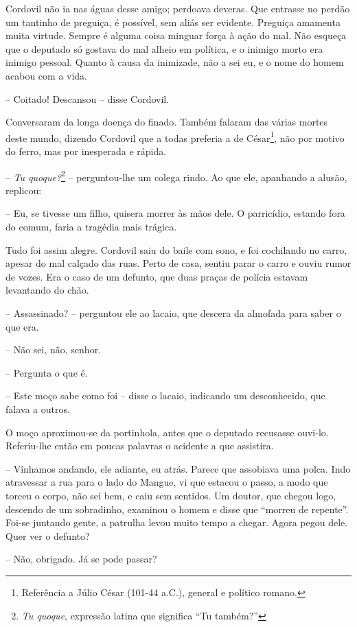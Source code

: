 Cordovil não ia nas águas desse amigo; perdoava deveras. Que entrasse no
perdão um tantinho de preguiça, é possível, sem aliás ser evidente.
Preguiça amamenta muita virtude. Sempre é alguma coisa minguar força à
ação do mal. Não esqueça que o deputado só gostava do mal alheio em
política, e o inimigo morto era inimigo pessoal. Quanto à causa da
inimizade, não a sei eu, e o nome do homem acabou com a vida.

-- Coitado! Descansou -- disse Cordovil.

Conversaram da longa doença do finado. Também falaram das várias mortes
deste mundo, dizendo Cordovil que a todas preferia a de César\footnote{Referência
  a Júlio César (101-44 a.C.), general e político romano.}, não por
motivo do ferro, mas por inesperada e rápida.

-- \emph{Tu quoque?}\footnote{\emph{Tu quoque}, expressão latina que
  significa ``Tu também?''} -- perguntou-lhe um colega rindo. Ao que
ele, apanhando a alusão, replicou:

-- Eu, se tivesse um filho, quisera morrer às mãos dele. O parricídio,
estando fora do comum, faria a tragédia mais trágica.

Tudo foi assim alegre. Cordovil saiu do baile com sono, e foi cochilando
no carro, apesar do mal calçado das ruas. Perto de casa, sentiu parar o
carro e ouviu rumor de vozes. Era o caso de um defunto, que duas praças
de polícia estavam levantando do chão.

-- Assassinado? -- perguntou ele ao lacaio, que descera da almofada para
saber o que era.

-- Não sei, não, senhor.

-- Pergunta o que é.

-- Este moço sabe como foi -- disse o lacaio, indicando um desconhecido,
que falava a outros.

O moço aproximou-se da portinhola, antes que o deputado recusasse
ouvi-lo. Referiu-lhe então em poucas palavras o acidente a que
assistira.

-- Vínhamos andando, ele adiante, eu atrás. Parece que assobiava uma
polca. Indo atravessar a rua para o lado do Mangue, vi que estacou o
passo, a modo que torceu o corpo, não sei bem, e caiu sem sentidos. Um
doutor, que chegou logo, descendo de um sobradinho, examinou o homem e
disse que ``morreu de repente''. Foi-se juntando gente, a patrulha levou
muito tempo a chegar. Agora pegou dele. Quer ver o defunto?

-- Não, obrigado. Já se pode passar?

